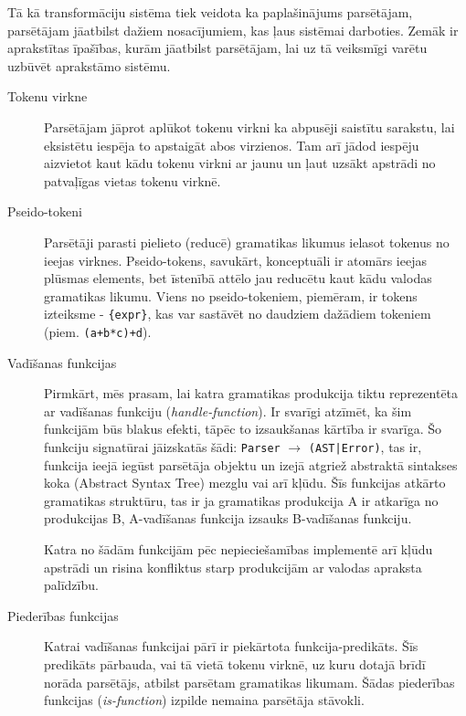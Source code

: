 
Tā kā transformāciju sistēma tiek veidota ka paplašinājums parsētājam, parsētājam jāatbilst dažiem nosacījumiem, kas ļaus sistēmai darboties. Zemāk ir aprakstītas īpašības, kurām jāatbilst parsētājam, lai uz tā veiksmīgi varētu uzbūvēt aprakstāmo sistēmu.
\begin{description}
\item[Tokenu virkne]
Parsētājam jāprot aplūkot tokenu virkni ka abpusēji saistītu sarakstu, lai eksistētu iespēja to apstaigāt abos virzienos. Tam arī jādod iespēju aizvietot kaut kādu tokenu virkni ar jaunu un ļaut uzsākt apstrādi no patvaļīgas vietas tokenu virknē.

\item[Pseido-tokeni]
Parsētāji parasti pielieto (reducē) gramatikas likumus ielasot tokenus no ieejas virknes. Pseido-tokens, savukārt, konceptuāli ir atomārs ieejas plūsmas elements, bet īstenībā attēlo jau reducētu kaut kādu valodas gramatikas likumu. Viens no pseido-tokeniem, piemēram, ir tokens izteiksme - \verb|{expr}|, kas var sastāvēt no daudziem dažādiem tokeniem (piem. \verb|(a+b*c)+d|).

\item[Vadīšanas funkcijas]
Pirmkārt, mēs prasam, lai katra gramatikas produkcija tiktu reprezentēta ar vadīšanas funkciju (\emph{handle-function}). Ir svarīgi atzīmēt, ka šim funkcijām būs blakus efekti, tāpēc to izsaukšanas kārtība ir svarīga. Šo funkciju signatūrai jāizskatās šādi: \verb|Parser| $\to$ \verb/(AST|Error)/, tas ir, funkcija ieejā iegūst parsētāja objektu un izejā atgriež abstraktā sintakses koka (Abstract Syntax Tree) mezglu vai arī kļūdu. Šīs funkcijas atkārto gramatikas struktūru, tas ir ja gramatikas produkcija A ir atkarīga no produkcijas B, A-vadīšanas funkcija izsauks B-vadīšanas funkciju. 

Katra no šādām funkcijām pēc nepieciešamības implementē arī kļūdu apstrādi un risina konfliktus starp produkcijām ar valodas apraksta palīdzību.

\item[Piederības funkcijas]
Katrai vadīšanas funkcijai pārī ir piekārtota funkcija-predikāts. Šīs predikāts pārbauda, vai tā vietā tokenu virknē, uz kuru dotajā brīdī norāda parsētājs, atbilst parsētam gramatikas likumam. Šādas piederības funkcijas (\emph{is-function}) izpilde nemaina parsētāja stāvokli. 


\end{description}
